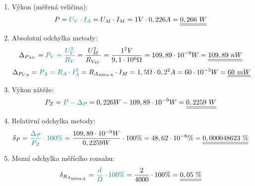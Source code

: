\documentclass[a4paper, czech]{article}
\begin{document}
\begin{enumerate}
    \item Výkon (měřená veličina):
    \begin{multline*}
        P = \textcolor{teal}{U_V \cdot I_A} = U_M \cdot I_M = 1 V \cdot 0,226 A = \underline{\underline{0,266\ W}} \hfill
    \end{multline*}

    \item Absolutní odchylka metody:
    \begin{multline*}
        \Delta_{P_{AV}} = \textcolor{teal}{P_V = \frac{U_V^2}{R_V}} = \frac{U_M^2}{R_{V_{4V}}} = \frac{1^2 V}{9,1 \cdot 10^6 \Omega} = 109,89 \cdot 10^{-9} W = \underline{\underline{109,89\ nW}} \hfill
    \end{multline*}
    \begin{multline*}
        \Delta_{P_{VA}} = \textcolor{teal}{P_A = R_A \cdot I_A^2} = R_{A_{400mA}} \cdot I_M = 1,5 \Omega \cdot 0,2^2 A = 60 \cdot 10^{-3} W = \underline{\underline{60\ mW}} \hfill
    \end{multline*}

    \item Výkon zátěže:
    \begin{multline*}
        P_Z = \textcolor{teal}{P - \Delta_P} = 0,226 W - 109,89 \cdot 10^{-9} W = \underline{\underline{0,2259\ W}} \hfill
    \end{multline*}

    \item Relativní odchylka metody:
    \begin{multline*}
        \delta_P = \textcolor{teal}{\frac{\Delta_P}{P_Z} \cdot 100 \%} = \frac{109,89 \cdot 10^{-9} W}{0,2259 W} \cdot 100 \% = 48,62 \cdot 10^{-6} \% = \underline{\underline{0,000048623\ \%}} \hfill
    \end{multline*}

    \item Mezní odchylka měřícího rozsahu:
    \begin{multline*}
        \delta_{R_{A_{400mA}}} = \textcolor{teal}{\frac{d}{D} \cdot 100 \%} = \frac{2}{4000} \cdot 100 \% = \underline{\underline{0,05\ \%}} \hfill
    \end{multline*}


\end{enumerate}
\end{document}
